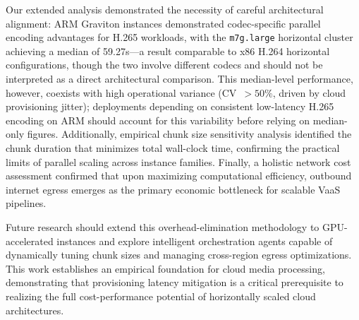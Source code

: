 \documentclass[conference]{IEEEtran}
\begin{document}
Our extended analysis demonstrated the necessity of careful architectural alignment: ARM Graviton instances demonstrated codec-specific parallel encoding advantages for H.265 workloads, with the \texttt{m7g.large} horizontal cluster achieving a median of 59.27s---a result comparable to x86 H.264 horizontal configurations, though the two involve different codecs and should not be interpreted as a direct architectural comparison. This median-level performance, however, coexists with high operational variance (CV~$>50\%$, driven by cloud provisioning jitter); deployments depending on consistent low-latency H.265 encoding on ARM should account for this variability before relying on median-only figures. Additionally, empirical chunk size sensitivity analysis identified the chunk duration that minimizes total wall-clock time, confirming the practical limits of parallel scaling across instance families. Finally, a holistic network cost assessment confirmed that upon maximizing computational efficiency, outbound internet egress emerges as the primary economic bottleneck for scalable VaaS pipelines.

Future research should extend this overhead-elimination methodology to GPU-accelerated instances and explore intelligent orchestration agents capable of dynamically tuning chunk sizes and managing cross-region egress optimizations. This work establishes an empirical foundation for cloud media processing, demonstrating that provisioning latency mitigation is a critical prerequisite to realizing the full cost-performance potential of horizontally scaled cloud architectures.

\end{document}
